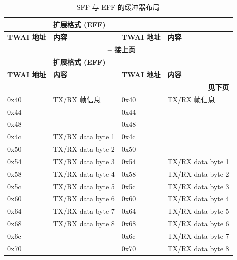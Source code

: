 \begin{longtable}[c]{|p{2.5cm}|p{4cm}|p{2.5cm}|p{4cm}|}
\caption{SFF 与 EFF 的缓冲器布局}\label{tab:twai-buffer-layout-std-extended-frame-format}
\\\hline
    \rowcolor{lightgray}
        \multicolumn{2}{|l|}{\textbf{标准格式 (SFF)}} &\multicolumn{2}{|l|}{\textbf{扩展格式 (EFF)}} \\\hline
    \rowcolor{gray!25}
        \textbf{TWAI 地址} & \textbf{内容} & \textbf{TWAI 地址} & \textbf{内容}\\\hline
    \endfirsthead
    
    \multicolumn{4}{c}{\bfseries \tablename\ \thetable{} -- 接上页}\\\hline
    
    \rowcolor{lightgray}
        \multicolumn{2}{|l|}{\textbf{标准格式 (SFF)}} &\multicolumn{2}{|l|}{\textbf{扩展格式 (EFF)}} \\\hline
    \rowcolor{gray!25}
        \textbf{TWAI 地址} & \textbf{内容} & \textbf{TWAI 地址} & \textbf{内容}\\\hline
    \endhead
    \multicolumn{4}{r}{\textbf{见下页}} \\
    \endfoot
    \endlastfoot
    
0x40&TX/RX 帧信息 &0x40&TX/RX 帧信息\\\hline
0x44&\cellcolor{mycyan}{TX/RX identifier 1}&0x44&\cellcolor{mycyan}{TX/RX identifier 1}\\\hline
0x48&\cellcolor{mycyan}{TX/RX identifier 2}&0x48&\cellcolor{mycyan}{TX/RX identifier 2}\\\hline
0x4c&TX/RX data byte 1&0x4c&\cellcolor{mycyan}{TX/RX identifier 3}\\\hline
0x50&TX/RX data byte 2&0x50&\cellcolor{mycyan}{TX/RX identifier 4}\\\hline
0x54&TX/RX data byte 3&0x54&TX/RX data byte 1\\\hline
0x58&TX/RX data byte 4&0x58&TX/RX data byte 2\\\hline
0x5c&TX/RX data byte 5&0x5c&TX/RX data byte 3\\\hline
0x60&TX/RX data byte 6&0x60&TX/RX data byte 4\\\hline
0x64&TX/RX data byte 7&0x64&TX/RX data byte 5\\\hline
0x68&TX/RX data byte 8&0x68&TX/RX data byte 6\\\hline
0x6c&\cellcolor{yellow}{保留}&0x6c&TX/RX data byte 7\\\hline
0x70&\cellcolor{yellow}{保留}&0x70&TX/RX data byte 8\\\hline
\end{longtable}
